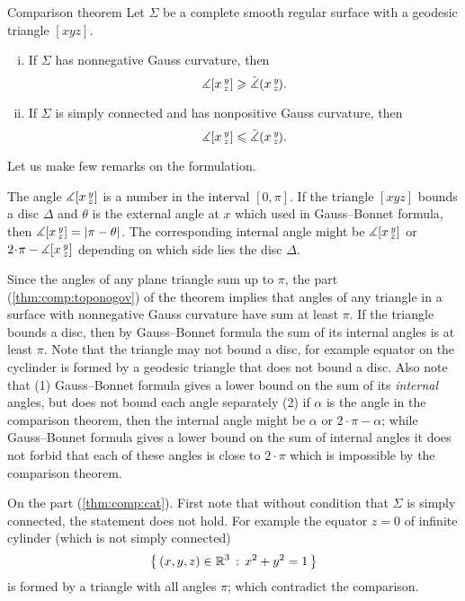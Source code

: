 \begin{thm}{Comparison theorem}\label{thm:comp}
Let $\Sigma$ be a complete smooth regular surface with a geodesic triangle $[xyz]$.
\begin{enumerate}[(i)]
 \item\label{thm:comp:toponogov} If $\Sigma$ has nonnegative Gauss curvature, then 
 \[\measuredangle[x\,{}^{y}_{z}]\geqslant\tilde\measuredangle(x\,{}^{y}_{z}\hspace{-0.2ex}).\]
 \item\label{thm:comp:cat} If $\Sigma$ is simply connected and has nonpositive Gauss curvature,
 then 
 \[\measuredangle[x\,{}^{y}_{z}]\leqslant\tilde\measuredangle(x\,{}^{y}_{z}\hspace{-0.2ex}).\]
\end{enumerate}

\end{thm}


Let us make few remarks on the formulation.

The angle $\measuredangle[x\,{}^{y}_{z}]$ is a number in the interval $[0,\pi]$.
If the triangle $[xyz]$ bounds a disc $\Delta$ and $\theta$ is the external angle at  $x$ which used in Gauss--Bonnet formula, 
then $\measuredangle[x\,{}^{y}_{z}]=|\pi-\theta|$.
The corresponding internal angle might be $\measuredangle[x\,{}^{y}_{z}]$ or $2\cdot\pi-\measuredangle\hinge {x}{y}{z}$ depending on which side lies the disc $\Delta$.

Since the angles of any plane triangle sum up to $\pi$,
the part (\ref{thm:comp:toponogov}) of the theorem implies that angles of any triangle in a surface with nonnegative Gauss curvature have sum at least $\pi$.
If the triangle bounds a disc, then by Gauss--Bonnet formula the sum of its internal angles is at least $\pi$.
Note that the triangle may not bound a disc, for example equator on the cyclinder is formed by a geodesic triangle that does not bound a disc.
Also note that (1) Gauss--Bonnet formula gives a lower bound on the sum of its \emph{internal} angles, but does not bound each angle separately (2) if $\alpha$ is the angle in the comparison theorem, then the internal angle might be $\alpha$ or $2\cdot\pi-\alpha$; while Gauss--Bonnet formula gives a lower bound on the sum of internal angles it does not forbid that each of these angles is close to $2\cdot \pi$ which is impossible by the comparison theorem.

On the part (\ref{thm:comp:cat}).
First note that without condition that $\Sigma$ is simply connected, the statement does not hold.
For example the equator $z=0$ of infinite cylinder (which is not simply connected)
\[\left\{\,{(x,y,z)\in\mathbb{R}^3}\,:\,{x^2+y^2=1}\,\right\}\]
is formed by a triangle with all angles $\pi$; which contradict the comparison.

